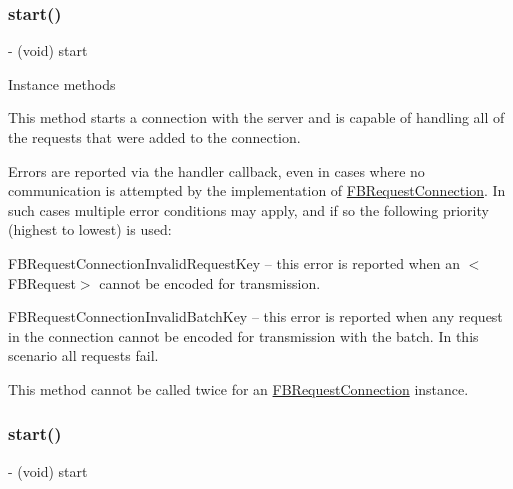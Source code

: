 \subsubsection{\texorpdfstring{start()}{start()}\hspace{0.1cm}{\footnotesize\ttfamily [2/5]}}
{\footnotesize\ttfamily -\/ (void) start \begin{DoxyParamCaption}{ }\end{DoxyParamCaption}}

Instance methods

This method starts a connection with the server and is capable of handling all of the requests that were added to the connection.

Errors are reported via the handler callback, even in cases where no communication is attempted by the implementation of {\ttfamily \hyperlink{interfaceFBRequestConnection}{F\+B\+Request\+Connection}}. In such cases multiple error conditions may apply, and if so the following priority (highest to lowest) is used\+:


\begin{DoxyItemize}
\item {\ttfamily F\+B\+Request\+Connection\+Invalid\+Request\+Key} -- this error is reported when an $<$\+F\+B\+Request$>$ cannot be encoded for transmission.
\item {\ttfamily F\+B\+Request\+Connection\+Invalid\+Batch\+Key} -- this error is reported when any request in the connection cannot be encoded for transmission with the batch. In this scenario all requests fail.
\end{DoxyItemize}

This method cannot be called twice for an {\ttfamily \hyperlink{interfaceFBRequestConnection}{F\+B\+Request\+Connection}} instance. \mbox{\label{interfaceFBRequestConnection_a8ddb3ae0c9915b148492678fdbc66a6c}} 
\subsubsection{\texorpdfstring{start()}{start()}\hspace{0.1cm}{\footnotesize\ttfamily [3/5]}}
{\footnotesize\ttfamily -\/ (void) start \begin{DoxyParamCaption}{ }\end{DoxyParamCaption}}


